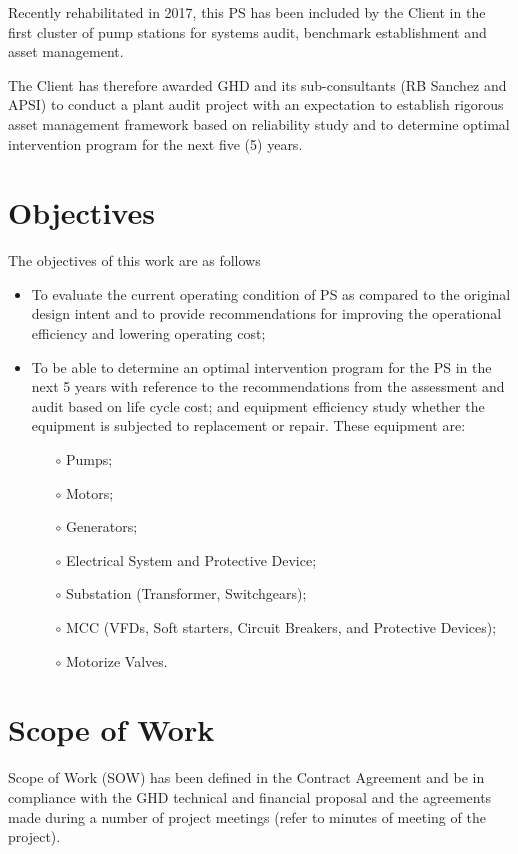 Recently rehabilitated in 2017, this PS has been included by the Client in the first cluster of pump stations for systems audit, benchmark establishment and asset management.

The Client has therefore awarded GHD and its sub-consultants (RB Sanchez and APSI) to conduct a plant audit project with an expectation to establish rigorous asset management framework based on reliability study and to determine optimal intervention program for the next five (5) years.

\section{Objectives}
The objectives of this work are as follows
\begin{itemize}
	\item To evaluate the current operating condition of PS as compared to the original design intent and to provide recommendations for improving the operational efficiency and lowering operating cost;
	\item To be able to determine an optimal intervention program for the PS in the next 5 years with reference to the recommendations from the assessment and audit based on life cycle cost; and equipment efficiency study whether the equipment is subjected to replacement or repair. These equipment are:
	\begin{itemize}
		\item[$\circ$] Pumps;
		\item[$\circ$] Motors;
		\item[$\circ$] Generators;
		\item[$\circ$] Electrical System and Protective Device;
		\item[$\circ$] Substation (Transformer, Switchgears);
		\item[$\circ$] MCC (VFDs, Soft starters, Circuit Breakers, and Protective Devices);
		\item[$\circ$] Motorize Valves.	
	\end{itemize}
\end{itemize}

\section{Scope of Work}
Scope of Work (SOW) has been defined in the Contract Agreement and be in compliance with the GHD technical and financial proposal and the agreements made during a number of project meetings (refer to minutes of meeting of the project). 

